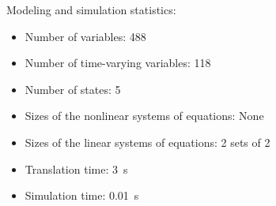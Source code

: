 \begin{contextbox}
  Modeling and simulation statistics:
  \begin{itemize}
    \item Number of variables: 488
    \item Number of time-varying variables: 118
    \item Number of states: 5
    \item Sizes of the nonlinear systems of equations: None
    \item Sizes of the linear systems of equations: 2 sets of 2
    \item Translation time: \SI{3}{s}
    \item Simulation time: \SI{0.01}{s}
  \end{itemize}
\end{contextbox}